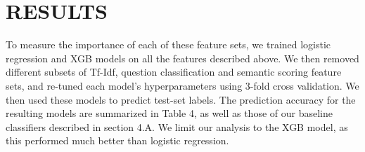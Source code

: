 \documentclass[letterpaper, 10 pt, conference]{ieeeconf}  %
\begin{document}
\section{RESULTS}

To measure the importance of each of these feature sets, we trained logistic regression and XGB models on all the features described above. We then removed different subsets of Tf-Idf, question classification and semantic scoring feature sets, and re-tuned each model's hyperparameters using 3-fold cross validation. We then used these models to predict test-set labels. The prediction accuracy for the resulting models are summarized in Table 4, as well as those of our baseline classifiers described in section 4.A. We limit our analysis to the XGB model, as this performed much better than logistic regression. 
\end{document}
